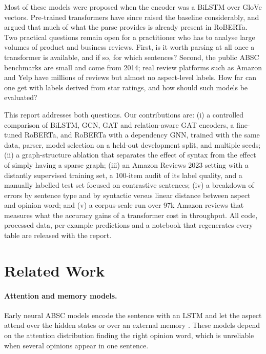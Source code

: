 \documentclass[11pt]{article}
\begin{document}
Most of these models were proposed when the encoder was a BiLSTM over GloVe vectors. Pre-trained transformers have since raised the baseline considerably, and \citet{dai-etal-2021-syntax} argued that much of what the parse provides is already present in RoBERTa. Two practical questions remain open for a practitioner who has to analyse large volumes of product and business reviews. First, is it worth parsing at all once a transformer is available, and if so, for which sentences? Second, the public ABSC benchmarks are small and come from 2014; real review platforms such as Amazon and Yelp have millions of reviews but almost no aspect-level labels. How far can one get with labels derived from star ratings, and how should such models be evaluated?

This report addresses both questions. Our contributions are:
(i) a controlled comparison of BiLSTM, GCN, GAT and relation-aware GAT encoders, a fine-tuned RoBERTa, and RoBERTa with a dependency GNN, trained with the same data, parser, model selection on a held-out development split, and multiple seeds;
(ii) a graph-structure ablation that separates the effect of syntax from the effect of simply having a sparse graph;
(iii) an Amazon Reviews 2023 setting with a distantly supervised training set, a 100-item audit of its label quality, and a manually labelled test set focused on contrastive sentences;
(iv) a breakdown of errors by sentence type and by syntactic versus linear distance between aspect and opinion word; and
(v) a corpus-scale run over 97k Amazon reviews that measures what the accuracy gains of a transformer cost in throughput.
All code, processed data, per-example predictions and a notebook that regenerates every table are released with the report.

\section{Related Work}

\paragraph{Attention and memory models.} Early neural ABSC models encode the sentence with an LSTM and let the aspect attend over the hidden states \citep{wang-etal-2016-attention} or over an external memory \citep{tang-etal-2016-aspect}. These models depend on the attention distribution finding the right opinion word, which is unreliable when several opinions appear in one sentence.
\end{document}
